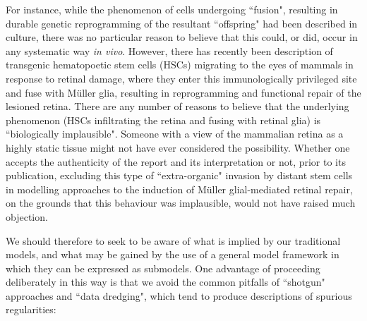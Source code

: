 For instance, while the phenomenon of cells undergoing ``fusion", resulting in durable genetic reprogramming of the resultant ``offspring" had been described in culture, there was no particular reason to believe that this could, or did, occur in any systematic way \textit{in vivo}. However, there has recently been description of transgenic hematopoetic stem cells (HSCs) migrating to the eyes of mammals in response to retinal damage, where they enter this immunologically privileged site and fuse with M\"{u}ller glia, resulting in reprogramming and functional repair of the lesioned retina.\cite{Pesaresi2018,Sanges2016} There are any number of reasons to believe that the underlying phenomenon (HSCs infiltrating the retina and fusing with retinal glia) is ``biologically implausible". Someone with a view of the mammalian retina as a highly static tissue might not have ever considered the possibility. Whether one accepts the authenticity of the report and its interpretation or not, prior to its publication, excluding this type of ``extra-organic" invasion by distant stem cells in modelling approaches to the induction of M\"{u}ller glial-mediated retinal repair, on the grounds that this behaviour was implausible, would not have raised much objection.

We should therefore to seek to be aware of what is implied by our traditional models, and what may be gained by the use of a general model framework in which they can be expressed as submodels. One advantage of proceeding deliberately in this way is that we avoid the common pitfalls of ``shotgun" approaches and ``data dredging", which tend to produce descriptions of spurious regularities:


